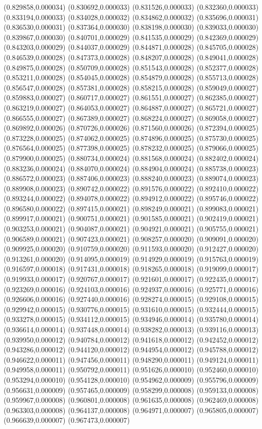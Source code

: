 {(0.829858,0.000034) (0.830692,0.000033) (0.831526,0.000033) (0.832360,0.000033) (0.833194,0.000033) (0.834028,0.000032) (0.834862,0.000032) (0.835696,0.000031) (0.836530,0.000031) (0.837364,0.000030) (0.838198,0.000030) (0.839033,0.000030) (0.839867,0.000030) (0.840701,0.000029) (0.841535,0.000029) (0.842369,0.000029) (0.843203,0.000029) (0.844037,0.000029) (0.844871,0.000028) (0.845705,0.000028) (0.846539,0.000028) (0.847373,0.000028) (0.848207,0.000028) (0.849041,0.000028) (0.849875,0.000028) (0.850709,0.000028) (0.851543,0.000028) (0.852377,0.000028) (0.853211,0.000028) (0.854045,0.000028) (0.854879,0.000028) (0.855713,0.000028) (0.856547,0.000028) (0.857381,0.000028) (0.858215,0.000028) (0.859049,0.000027) (0.859883,0.000027) (0.860717,0.000027) (0.861551,0.000027) (0.862385,0.000027) (0.863219,0.000027) (0.864053,0.000027) (0.864887,0.000027) (0.865721,0.000027) (0.866555,0.000027) (0.867389,0.000027) (0.868224,0.000027) (0.869058,0.000027) (0.869892,0.000026) (0.870726,0.000026) (0.871560,0.000026) (0.872394,0.000025) (0.873228,0.000025) (0.874062,0.000025) (0.874896,0.000025) (0.875730,0.000025) (0.876564,0.000025) (0.877398,0.000025) (0.878232,0.000025) (0.879066,0.000025) (0.879900,0.000025) (0.880734,0.000024) (0.881568,0.000024) (0.882402,0.000024) (0.883236,0.000024) (0.884070,0.000024) (0.884904,0.000024) (0.885738,0.000023) (0.886572,0.000023) (0.887406,0.000023) (0.888240,0.000023) (0.889074,0.000023) (0.889908,0.000023) (0.890742,0.000022) (0.891576,0.000022) (0.892410,0.000022) (0.893244,0.000022) (0.894078,0.000022) (0.894912,0.000022) (0.895746,0.000022) (0.896580,0.000022) (0.897415,0.000021) (0.898249,0.000021) (0.899083,0.000021) (0.899917,0.000021) (0.900751,0.000021) (0.901585,0.000021) (0.902419,0.000021) (0.903253,0.000021) (0.904087,0.000021) (0.904921,0.000021) (0.905755,0.000021) (0.906589,0.000021) (0.907423,0.000021) (0.908257,0.000020) (0.909091,0.000020) (0.909925,0.000020) (0.910759,0.000020) (0.911593,0.000020) (0.912427,0.000020) (0.913261,0.000020) (0.914095,0.000019) (0.914929,0.000019) (0.915763,0.000019) (0.916597,0.000018) (0.917431,0.000018) (0.918265,0.000018) (0.919099,0.000017) (0.919933,0.000017) (0.920767,0.000017) (0.921601,0.000017) (0.922435,0.000017) (0.923269,0.000016) (0.924103,0.000016) (0.924937,0.000016) (0.925771,0.000016) (0.926606,0.000016) (0.927440,0.000016) (0.928274,0.000015) (0.929108,0.000015) (0.929942,0.000015) (0.930776,0.000015) (0.931610,0.000015) (0.932444,0.000015) (0.933278,0.000015) (0.934112,0.000015) (0.934946,0.000014) (0.935780,0.000014) (0.936614,0.000014) (0.937448,0.000014) (0.938282,0.000013) (0.939116,0.000013) (0.939950,0.000012) (0.940784,0.000012) (0.941618,0.000012) (0.942452,0.000012) (0.943286,0.000012) (0.944120,0.000012) (0.944954,0.000012) (0.945788,0.000012) (0.946622,0.000011) (0.947456,0.000011) (0.948290,0.000011) (0.949124,0.000011) (0.949958,0.000011) (0.950792,0.000011) (0.951626,0.000010) (0.952460,0.000010) (0.953294,0.000010) (0.954128,0.000010) (0.954962,0.000009) (0.955796,0.000009) (0.956631,0.000009) (0.957465,0.000009) (0.958299,0.000008) (0.959133,0.000008) (0.959967,0.000008) (0.960801,0.000008) (0.961635,0.000008) (0.962469,0.000008) (0.963303,0.000008) (0.964137,0.000008) (0.964971,0.000007) (0.965805,0.000007) (0.966639,0.000007) (0.967473,0.000007) }
